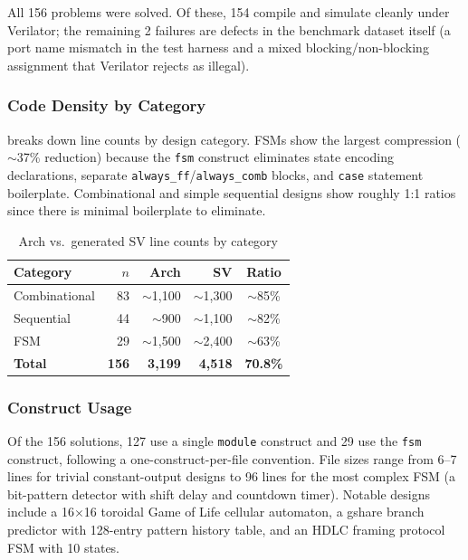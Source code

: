 \documentclass[manuscript]{acmart}
\begin{document}
All 156 problems were solved. Of these, 154 compile and simulate cleanly under Verilator; the remaining 2 failures are defects in the benchmark dataset itself (a port name mismatch in the test harness and a mixed blocking/non-blocking assignment that Verilator rejects as illegal).

\subsubsection{Code Density by Category}

 breaks down line counts by design category. FSMs show the largest compression (${\sim}$37\% reduction) because the \texttt{fsm} construct eliminates state encoding declarations, separate \texttt{always\_ff}/\texttt{always\_comb} blocks, and \texttt{case} statement boilerplate. Combinational and simple sequential designs show roughly 1:1 ratios since there is minimal boilerplate to eliminate.

\begin{table}[H]
\centering
\caption{Arch vs.\ generated SV line counts by category}
\label{tab:density}
\small
\begin{tabular}{@{}lrrrc@{}}
\toprule
\textbf{Category} & \textbf{$n$} & \textbf{Arch} & \textbf{SV} & \textbf{Ratio} \\
\midrule
Combinational & 83 & ${\sim}$1,100 & ${\sim}$1,300 & ${\sim}$85\% \\
Sequential & 44 & ${\sim}$900 & ${\sim}$1,100 & ${\sim}$82\% \\
FSM & 29 & ${\sim}$1,500 & ${\sim}$2,400 & ${\sim}$63\% \\
\midrule
\textbf{Total} & \textbf{156} & \textbf{3,199} & \textbf{4,518} & \textbf{70.8\%} \\
\bottomrule
\end{tabular}
\end{table}

\subsubsection{Construct Usage}

Of the 156 solutions, 127 use a single \texttt{module} construct and 29 use the \texttt{fsm} construct, following a one-construct-per-file convention. File sizes range from 6--7 lines for trivial constant-output designs to 96 lines for the most complex FSM (a bit-pattern detector with shift delay and countdown timer). Notable designs include a 16$\times$16 toroidal Game of Life cellular automaton, a gshare branch predictor with 128-entry pattern history table, and an HDLC framing protocol FSM with 10 states.
\end{document}
